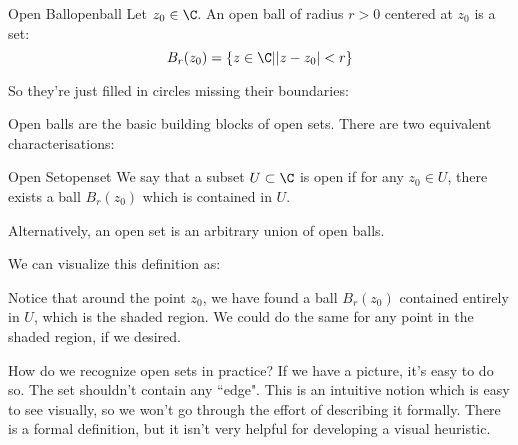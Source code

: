 \begin{defbo}{Open Ball}{openball}
Let $z_0\in \C$. An open ball of radius $r > 0$ centered at $z_0$ is a set:
$$B_r(z_0) = \{z\in \C| |z-z_0|< r\}$$
\end{defbo}

So they're just filled in circles missing their boundaries:

\begin{center}
\end{center}

Open balls are the basic building blocks of open sets. There are two equivalent characterisations:

\begin{defbo}{Open Set}{openset}
We say that a subset $U \subset \C$ is open if for any $z_0 \in U$, there exists a ball $B_r(z_0)$ which is contained in $U$.

Alternatively, an open set is an arbitrary union of open balls.
\end{defbo}

We can visualize this definition as:

\begin{center}
\end{center}

Notice that around the point $z_0$, we have found a ball $B_r(z_0)$ contained entirely in $U$, which is the shaded region. We could do the same for any point in the shaded region, if we desired.

How do we recognize open sets in practice? If we have a picture, it's easy to do so. The set shouldn't contain any ``edge". This is an intuitive notion which is easy to see visually, so we won't go through the effort of describing it formally. There is a formal definition, but it isn't very helpful for developing a visual heuristic.

